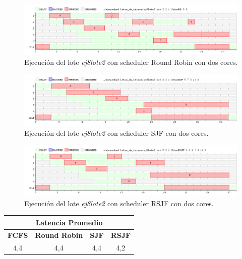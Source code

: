 \begin{figure}[!h]
	\begin{center}
		\includegraphics[width=500px]{imagenes/ej8_prueba2_rr2.png}
		\caption{Ejecución del lote \emph{ej8lote2} con scheduler Round Robin con dos cores.}
		\label{fig:grafico_ej8_prueba2_rr2}
	\end{center}
\end{figure}

\newpage

\begin{figure}[!h]
	\begin{center}
		\includegraphics[width=500px]{imagenes/ej8_prueba2_sjf2.png}
		\caption{Ejecución del lote \emph{ej8lote2} con scheduler SJF con dos cores.}
		\label{fig:grafico_ej8_prueba2_sjf2}
	\end{center}
\end{figure}

\begin{figure}[!h]
	\begin{center}
		\includegraphics[width=500px]{imagenes/ej8_prueba2_rsjf2.png}
		\caption{Ejecución del lote \emph{ej8lote2} con scheduler RSJF con dos cores.}
		\label{fig:grafico_ej8_prueba2_rsjf2}
	\end{center}
\end{figure}

\begin{center}
	\begin{tabular}{|c|c|c|c|}
		\hline
		\multicolumn{4}{|c|}{\large{\textbf{Latencia Promedio}}} \\
		\hline
		\textbf{FCFS} & \textbf{Round Robin} & \textbf{SJF} & \textbf{RSJF} \\
		\hline
		4,4 & 4,4 & 4,4 & 4,2 \\
		\hline
	\end{tabular}
\end{center}

